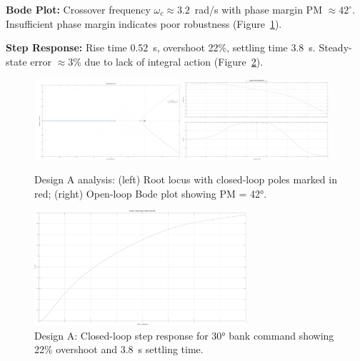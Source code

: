 \textbf{Bode Plot:} Crossover frequency $\omega_c \approx 3.2$~rad/s with phase margin PM $\approx 42^\circ$. Insufficient phase margin indicates poor robustness (Figure~\ref{fig:design_A_bode}).

\textbf{Step Response:} Rise time 0.52~s, overshoot 22\%, settling time 3.8~s. Steady-state error $\approx 3\%$ due to lack of integral action (Figure~\ref{fig:design_A_step}).

\begin{figure}[h!]
\centering
\includegraphics[width=0.48\textwidth]{../MATLAB/LaTeX_Exports/design_A_root_locus.pdf}
\includegraphics[width=0.48\textwidth]{../MATLAB/LaTeX_Exports/design_A_bode.pdf}
\caption{Design A analysis: (left) Root locus with closed-loop poles marked in red; (right) Open-loop Bode plot showing PM = 42°.}
\label{fig:design_A_rlocus}
\label{fig:design_A_bode}
\end{figure}

\begin{figure}[h!]
\centering
\includegraphics[width=0.7\textwidth]{../MATLAB/LaTeX_Exports/design_A_step.pdf}
\caption{Design A: Closed-loop step response for 30° bank command showing 22\% overshoot and 3.8~s settling time.}
\label{fig:design_A_step}
\end{figure}

